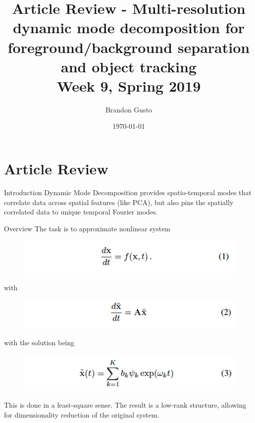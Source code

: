 \documentclass{beamer} \usepackage{graphicx,amsmath,amsfonts,amssymb,listings,tikz} \usepackage{multimedia}
\begin{document}
\section{Article Review}
\title{Article Review - Multi-resolution dynamic mode decomposition for foreground/background
separation and object tracking \\ Week 9, Spring 2019}
\author{Brandon Gusto} %
\date{\today}
\frame{\titlepage}

\begin{frame}{Introduction}
    \centering
    Dynamic Mode Decomposition provides spatio-temporal modes that correlate
    data across spatial features (like PCA), but also pins the spatially
    correlated data to unique temporal Fourier modes.
\end{frame}

\begin{frame}{Overview}
    The task is to approximate nonlinear system
    \begin{figure}
        \center
        \includegraphics[scale=0.5]{linearsys.png}
    \end{figure}
    with
    \begin{figure}
        \center
        \includegraphics[scale=0.5]{approx.png}
    \end{figure}
    with the solution being
    \begin{figure}
        \center
        \includegraphics[scale=0.5]{solution.png}
    \end{figure}
    This is done in a least-square sense. The result is a low-rank structure,
    allowing for dimensionality reduction of the original system.
\end{frame}
    
\end{document}
